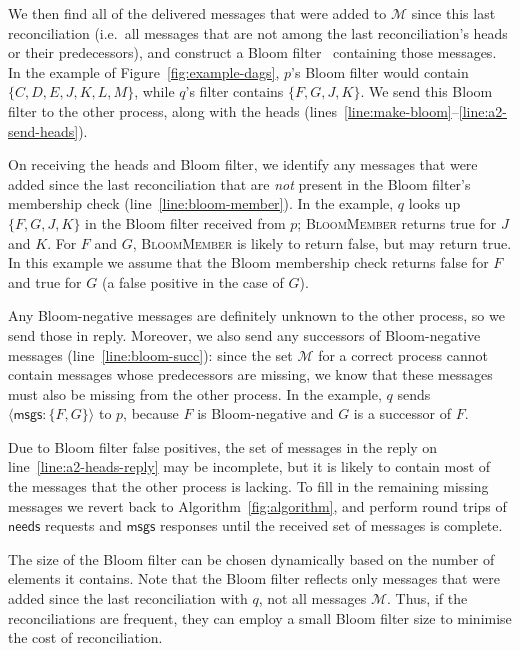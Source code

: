 \documentclass[a4paper,anonymous,USenglish]{lipics-v2019}
\begin{document}
We then find all of the delivered messages that were added to $\mathcal{M}$ since this last reconciliation (i.e.\ all messages that are not among the last reconciliation's heads or their predecessors), and construct a Bloom filter~\cite{Bloom:1970} containing those messages.
In the example of Figure~\ref{fig:example-dags}, $p$'s Bloom filter would contain $\{C, D, E, J, K, L, M\}$, while $q$'s filter contains $\{F, G, J, K\}$.
We send this Bloom filter to the other process, along with the heads (lines~\ref{line:make-bloom}--\ref{line:a2-send-heads}).

On receiving the heads and Bloom filter, we identify any messages that were added since the last reconciliation that are \emph{not} present in the Bloom filter's membership check (line~\ref{line:bloom-member}).
In the example, $q$ looks up $\{F, G, J, K\}$ in the Bloom filter received from $p$; \textsc{BloomMember} returns true for $J$ and $K$. For $F$ and $G$, \textsc{BloomMember} is likely to return false, but may return true.
In this example we assume that the Bloom membership check returns false for $F$ and true for $G$ (a false positive in the case of $G$).

Any Bloom-negative messages are definitely unknown to the other process, so we send those in reply.
Moreover, we also send any successors of Bloom-negative messages (line~\ref{line:bloom-succ}): since the set $\mathcal{M}$ for a correct process cannot contain messages whose predecessors are missing, we know that these messages must also be missing from the other process.
In the example, $q$ sends $\langle\mathsf{msgs}: \{F, G\}\rangle$ to $p$, because $F$ is Bloom-negative and $G$ is a successor of $F$.

Due to Bloom filter false positives, the set of messages in the reply on line~\ref{line:a2-heads-reply} may be incomplete, but it is likely to contain most of the messages that the other process is lacking.
To fill in the remaining missing messages we revert back to Algorithm~\ref{fig:algorithm}, and perform round trips of $\mathsf{needs}$ requests and $\mathsf{msgs}$ responses until the received set of messages is complete.

The size of the Bloom filter can be chosen dynamically based on the number of elements it contains.
Note that the Bloom filter reflects only messages that were added since the last reconciliation with $q$, not all messages $\mathcal{M}$.
Thus, if the reconciliations are frequent, they can employ a small Bloom filter size to minimise the cost of reconciliation.
\end{document}
